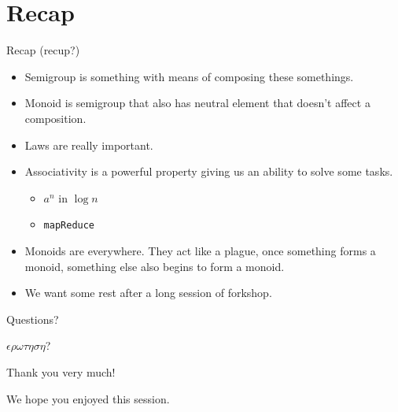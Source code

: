 \documentclass[presentation,aspectratio=169,smaller]{beamer}
\begin{document}
\section*{Recap}
\label{sec:org1f70c24}

\begin{frame}[label={sec:orge2909ef},fragile]{Recap (recup?)}
 \begin{itemize}
\item <1-> Semigroup is something with means of composing these somethings.
\item <2-> Monoid is semigroup that also has neutral element that doesn't affect a composition.
\item <3-> Laws are really important.
\item <4-> Associativity is a powerful property giving us an ability to solve some tasks.
\begin{itemize}
\item \(a^n\) in \(\log n\)
\item \texttt{mapReduce}
\end{itemize}
\item <5-> Monoids are everywhere. They act like a plague, once something forms a monoid,
something else also begins to form a monoid.
\item <6-> We want some rest after a long session of forkshop.
\end{itemize}
\end{frame}

\begin{frame}[label={sec:org65bcd8a}]{Questions?}
\centerline{\huge $\epsilon \rho \omega \tau \eta \sigma \eta$?}
\end{frame}

\begin{frame}[label={sec:org683ccbe}]{Thank you very much!}
\centerline{\huge We hope you enjoyed this session.}
\end{frame}
\end{document}
